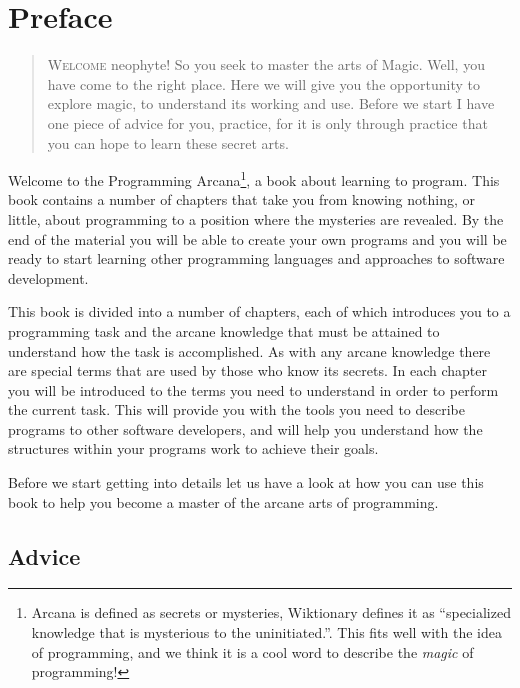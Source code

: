 \chapter*{Preface} %
\label{cha:preface}

\begin{quote}
  \Fontlukas\Large
  \renewcommand{\LettrineTextFont}{\relax}
  \lettrine[image=true,lines=3,lraise=0.1]
  {W}{elcome} neophyte!  So you seek to master the arts of Magic. Well, you have come to the right place. Here we will give you the opportunity to explore magic, to understand its working and use. Before we start I have one piece of advice for you, practice, for it is only through practice that you can hope to learn these secret arts.
\end{quote}

\bigskip

Welcome to the Programming Arcana\footnote{Arcana is defined as secrets or mysteries, Wiktionary defines it as ``specialized knowledge that is mysterious to the uninitiated.''. This fits well with the idea of programming, and we think it is a cool word to describe the \emph{magic} of programming!}, a book about learning to program. This book contains a number of chapters that take you from knowing nothing, or little, about programming to a position where the mysteries are revealed. By the end of the material you will be able to create your own programs and you will be ready to start learning other programming languages and approaches to software development.

This book is divided into a number of chapters, each of which introduces you to a programming task and the arcane knowledge that must be attained to understand how the task is accomplished. As with any arcane knowledge there are special terms that are used by those who know its secrets. In each chapter you will be introduced to the terms you need to understand in order to perform the current task. This will provide you with the tools you need to describe programs to other software developers, and will help you understand how the structures within your programs work to achieve their goals.

Before we start getting into details let us have a look at how you can use this book to help you become a master of the arcane arts of programming.




\section*{Advice} %
\label{sec:advice}

